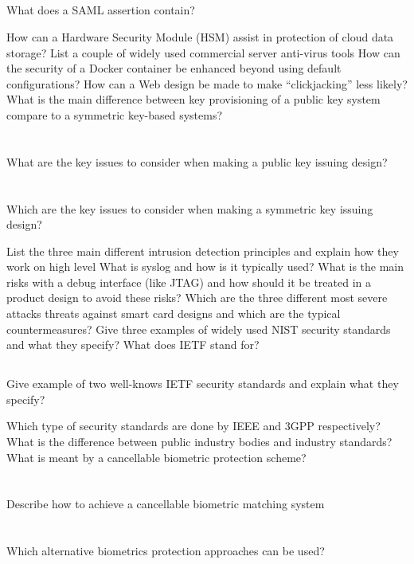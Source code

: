\begin{questions}
\begin{parts}
  \part{} What does a SAML assertion contain?
  \end{parts}

\question{} How can a Hardware Security Module (HSM) assist in protection of cloud data storage?
\question{} List a couple of widely used commercial server anti-virus tools
\question{} How can the security of a Docker container be enhanced beyond using default configurations?
\question{} How can a Web design be made to make ``clickjacking'' less likely?
\question{} What is the main difference between key provisioning of a public key system compare to a symmetric key-based systems?
  \begin{parts}
  \part{} What are the key issues to consider when making a public key issuing design?
  \part{} Which are the key issues to consider when making a symmetric key issuing design?
  \end{parts}

\question{} List the three main different intrusion detection principles and explain how they work on high level
\question{} What is syslog and how is it typically used?
\question{} What is the main risks with a debug interface (like JTAG) and how should it be treated in a product design to avoid these risks?
\question{} Which are the three different most severe attacks threats against smart card designs and which are the typical countermeasures?
\question{} Give three examples of widely used NIST security standards and what they specify?
\question{} What does IETF stand for?
  \begin{parts}
  \part{} Give example of two well-knows IETF security standards and explain what they specify?
  \end{parts}

\question{} Which type of security standards are done by IEEE and 3GPP respectively?
\question{} What is the difference between public industry bodies and industry standards?
\question{} What is meant by a cancellable biometric protection scheme?
  \begin{parts}
  \part{} Describe how to achieve a cancellable biometric matching system
  \part{} Which alternative biometrics protection approaches can be used?
  \end{parts}
\end{questions}

